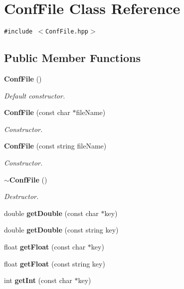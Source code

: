 \section{Conf\-File Class Reference}
\label{classConfFile}
{\tt \#include $<$Conf\-File.hpp$>$}

\subsection*{Public Member Functions}
\begin{CompactItemize}
\item 
{\bf Conf\-File} ()
\begin{CompactList}\small\item\em Default constructor. \item\end{CompactList}\item 
{\bf Conf\-File} (const char $\ast$file\-Name)
\begin{CompactList}\small\item\em Constructor. \item\end{CompactList}\item 
{\bf Conf\-File} (const string file\-Name)
\begin{CompactList}\small\item\em Constructor. \item\end{CompactList}\item 
{\bf $\sim$Conf\-File} ()\label{classConfFile_a3}

\begin{CompactList}\small\item\em Destructor. \item\end{CompactList}\item 
double {\bf get\-Double} (const char $\ast$key)\label{classConfFile_a4}

\item 
double {\bf get\-Double} (const string key)\label{classConfFile_a5}

\item 
float {\bf get\-Float} (const char $\ast$key)\label{classConfFile_a6}

\item 
float {\bf get\-Float} (const string key)\label{classConfFile_a7}

\item 
int {\bf get\-Int} (const char $\ast$key)\label{classConfFile_a8}


\end{CompactItemize}
